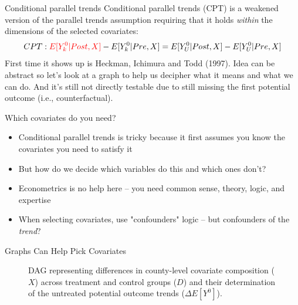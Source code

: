 \documentclass{beamer}
\begin{document}
\begin{frame}{Conditional parallel trends}
Conditional parallel trends (CPT) is a weakened version of the parallel trends assumption requiring that it holds \emph{within} the dimensions of the selected covariates:
\begin{align*}
CPT: \textcolor{red}{E[Y^0_k|Post, X]} - E[Y^0_k|Pre, X] = E[Y^0_U|Post, X] - E[Y^0_U|Pre, X]
\end{align*}
First time it shows up is Heckman, Ichimura and Todd (1997). Idea can be abstract so let's look at a graph to help us decipher what it means and what we can do. And it's still not directly testable due to still missing the first potential outcome (i.e., counterfactual). 
\end{frame}

\begin{frame}{Which covariates do you need?}

\begin{itemize}
\item Conditional parallel trends is tricky because it first assumes you know the covariates you need to satisfy it
\item But how do we decide which variables do this and which ones don't?
\item Econometrics is no help here -- you need common sense, theory, logic, and expertise
\item When selecting covariates, use "confounders" logic -- but confounders of the \emph{trend}?
\end{itemize}

\end{frame}
	



\begin{frame}{Graphs Can Help Pick Covariates}

\begin{figure}[h!]
    \centering
\caption{DAG representing differences in county-level covariate composition (\(X\)) across treatment and control groups (\(D\)) and their determination of the untreated potential outcome trends (\(\Delta E\left[Y^0\right]\)).}
\end{figure}

\end{frame}
\end{document}
